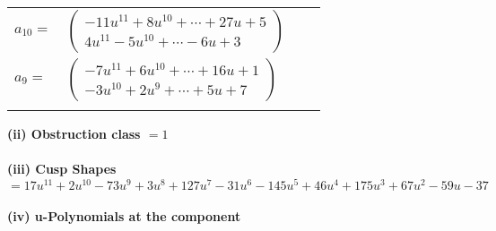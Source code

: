 \documentclass[1p]{elsarticle_modified}
\theoremstyle{definition}
\begin{document}
\begin{tabular}{m{7pt} m{180pt} m{7pt} m{180pt} }
\flushright $a_{10}=$&$\begin{pmatrix}-11 u^{11}+8 u^{10}+\cdots+27 u+5\\4 u^{11}-5 u^{10}+\cdots-6 u+3\end{pmatrix}$ \\
\flushright $a_{9}=$&$\begin{pmatrix}-7 u^{11}+6 u^{10}+\cdots+16 u+1\\-3 u^{10}+2 u^9+\cdots+5 u+7\end{pmatrix}$\\&\end{tabular}
\flushleft \textbf{(ii) Obstruction class $= 1$}\\~\\
\flushleft \textbf{(iii) Cusp Shapes $= 17 u^{11}+2 u^{10}-73 u^9+3 u^8+127 u^7-31 u^6-145 u^5+46 u^4+175 u^3+67 u^2-59 u-37$}\\~\\
\newpage\renewcommand{\arraystretch}{1}
\flushleft \textbf{(iv) u-Polynomials at the component}\newline \\
\end{document}
